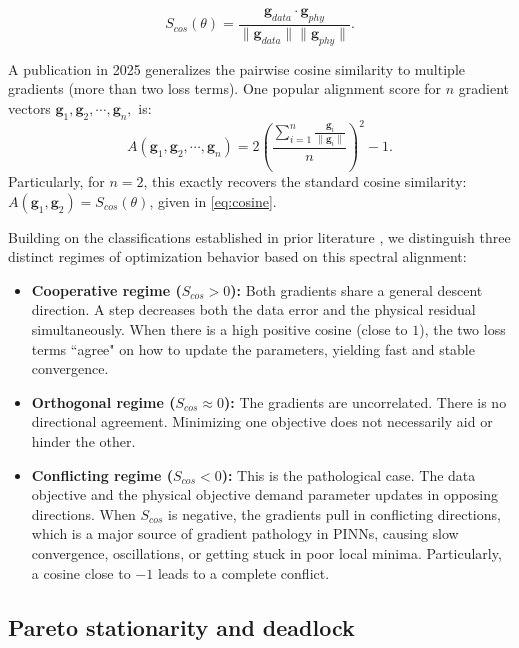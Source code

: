 \documentclass[11pt]{article}
\begin{document}
\begin{equation}\label{eq:cosine}
    S_{cos}(\theta) = \frac{\mathbf{g}_{data} \cdot \mathbf{g}_{phy}}{\| \mathbf{g}_{data} \| \| \mathbf{g}_{phy} \|}.
\end{equation}

A publication in 2025 \cite{wang2025gradient} generalizes the pairwise cosine similarity to multiple gradients (more than two loss terms). One popular alignment score for $n$ gradient vectors $\mathbf{g}_1, \mathbf{g}_2, \cdots, \mathbf{g}_n,$ is:
$$A(\mathbf{g}_1, \mathbf{g}_2, \cdots, \mathbf{g}_n)=  2 \left( \frac{ \sum_{i=1}^n \frac{\mathbf{g}_i}{\|\mathbf{g}_i\|} }{n} \right)^2-1.  $$
Particularly, for $n = 2$, this exactly recovers the standard cosine similarity: $A(\mathbf{g}_1, \mathbf{g}_2) =S_{cos}(\theta)$, given in \eqref{eq:cosine}.

Building on the classifications established in prior literature \cite{yu2020gradient, wang2021understanding}, we distinguish three distinct regimes of optimization behavior based on this spectral alignment:
\begin{itemize}
    \item \textbf{Cooperative regime ($S_{cos} > 0$):} Both gradients share a general descent direction. A step decreases both the data error and the physical residual simultaneously. When there is a high positive cosine  (close to $1$), the two loss terms ``agree" on how to update the parameters, yielding fast and stable convergence.
    \item \textbf{Orthogonal regime ($S_{cos} \approx 0$):} The gradients are uncorrelated. There is no directional agreement. Minimizing one objective does not necessarily aid or hinder the other.
    \item \textbf{Conflicting regime ($S_{cos} < 0$):} This is the pathological case. The data objective and the physical objective demand parameter updates in opposing directions. When $S_{cos}$ is negative,  the gradients pull in conflicting directions, which is a major source of gradient pathology in PINNs, causing slow convergence, oscillations, or getting stuck in poor local minima. Particularly, a cosine close to  $-1$ leads to a complete conflict.
\end{itemize}

\subsection{Pareto stationarity and deadlock}\label{sec:Pareto}
\end{document}
